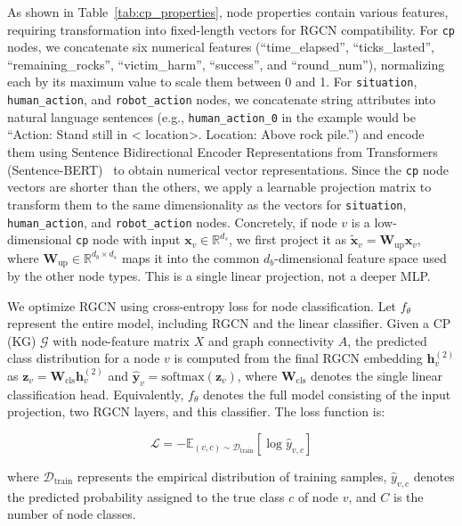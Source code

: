 \documentclass[letterpaper, 10 pt, conference]{ieeeconf}  %
\begin{document}
As shown in Table~\ref{tab:cp_properties}, node properties contain various features,
requiring transformation into fixed-length vectors for RGCN compatibility. For
\texttt{cp} nodes, we concatenate six numerical features (``time\_elapsed'',
``ticks\_lasted'', ``remaining\_rocks'', ``victim\_harm'', ``success'', and
``round\_num''), normalizing each by its maximum value to scale them between 0 and 1.
For \texttt{situation}, \texttt{human\_action}, and \texttt{robot\_action} nodes, we
concatenate string attributes into natural language sentences (e.g.,
\texttt{human\_action\_0} in the example would be ``Action: Stand still in \textless
location\textgreater. Location: Above rock pile.'') and encode them using Sentence
Bidirectional Encoder Representations from Transformers
(Sentence-BERT)~\cite{reimers2019sentencebertsentenceembeddingsusing} to obtain
numerical vector representations. Since the \texttt{cp} node vectors are shorter than
the others, we apply a learnable projection matrix to transform them to the same
dimensionality as the vectors for \texttt{situation}, \texttt{human\_action}, and
\texttt{robot\_action} nodes. Concretely, if node $v$ is a low-dimensional
\texttt{cp} node with input $\mathbf{x}_v \in \mathbb{R}^{d_s}$, we first project it as
$\tilde{\mathbf{x}}_v = \mathbf{W}_{\mathrm{up}} \mathbf{x}_v$,
where $\mathbf{W}_{\mathrm{up}} \in \mathbb{R}^{d_b \times d_s}$ maps it into the common
$d_b$-dimensional feature space used by the other node types. This is a single linear
projection, not a deeper MLP.

We optimize RGCN using cross-entropy loss for node classification. Let \( f_{\theta} \)
represent the entire model, including RGCN and the linear classifier. Given a CP (KG) \(
\mathcal{G} \) with node-feature matrix \( X \) and graph connectivity \( A \), the predicted
class distribution for a node \( v \) is computed from the final RGCN embedding
\(\mathbf{h}_v^{(2)}\) as $\mathbf{z}_v = \mathbf{W}_{\mathrm{cls}} \mathbf{h}_v^{(2)}$
and $\hat{\mathbf{y}}_v = \mathrm{softmax}(\mathbf{z}_v)$, where
$\mathbf{W}_{\mathrm{cls}}$ denotes the single linear classification head.
Equivalently, \( f_{\theta} \) denotes the full model consisting of the input
projection, two RGCN layers, and this classifier. The loss
function is:

\[
\mathcal{L} = - \mathbb{E}_{(v, c) \sim \mathcal{D}_\text{train}} \left[ \log \hat{y}_{v, c} \right]
\]

where \(\mathcal{D}_\text{train}\) represents the empirical distribution of training
samples, \(\hat{y}_{v,c}\) denotes the predicted probability assigned to the true class
\(c\) of node \(v\), and \(C\) is the number of node classes. 
\end{document}
